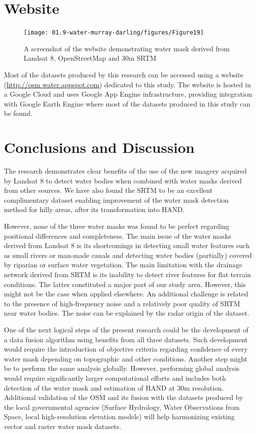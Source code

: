 \section{Website}


\begin{figure}
	\centering
	\texttt{[image: 01.9-water-murray-darling/figures/Figure19]}
	\caption{A screenshot of the website demonstrating water mask derived from Landsat 8, OpenStreetMap and 30m SRTM}
\end{figure}

Most of the datasets produced by this research can be accessed using a website (\url{http://osm water.appspot.com}) dedicated to this study. The website is hosted in a Google Cloud and uses Google App Engine infrastructure, providing integration with Google Earth Engine where most of the datasets produced in this study can be found.

\section{Conclusions and Discussion}
The research demonstrates clear benefits of the use of the new imagery acquired by Landsat 8 to detect water bodies when combined with water masks derived from other sources. We have also found the SRTM to be an excellent complimentary dataset enabling improvement of the water mask detection method for hilly areas, after its transformation into HAND.

However, none of the three water masks was found to be perfect regarding positional differences and completeness. The main issue of the water masks derived from Landsat 8 is its shortcomings in detecting small water features such as small rivers or man-made canals and detecting water bodies (partially) covered by riparian or surface water vegetation. The main limitation with the drainage network derived from SRTM is its inability to detect river features for flat terrain conditions. The latter constituted a major part of our study area. However, this might not be the case when applied elsewhere. An additional challenge is related to the presence of high-frequency noise and a relatively poor quality of SRTM near water bodies. The noise can be explained by the radar origin of the dataset. 

One of the next logical steps of the present research could be the development of a data fusion algorithm using benefits from all three datasets. Such development would require the introduction of objective criteria regarding confidence of every water mask depending on topographic and other conditions. Another step might be to perform the same analysis globally. However, performing global analysis would require significantly larger computational efforts and includes both detection of the water mask and estimation of HAND at 30m resolution. Additional validation of the OSM and its fusion with the datasets produced by the local governmental agencies (Surface Hydrology, Water Observations from Space, local high-resolution elevation models) will help harmonizing existing vector and raster water mask datasets.

